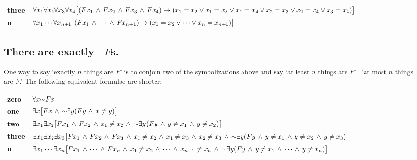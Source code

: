 {\begin{longtabu}{X[1,r]X[7,1]}
\textbf{three} & $\forall x_1\forall x_2\forall x_3\forall x_4\bigl[(Fx_1 \,\land\, Fx_2 \,\land\, Fx_3 \,\land\, Fx_4) \rightarrow (x_1=x_2 \lor x_1=x_3 \lor x_1=x_4 \lor x_2=x_3 \lor x_2=x_4 \lor x_3=x_4)\bigr]$ \\

\textbf{n} & $\forall x_1\cdots\forall x_{n+1}
\bigl[(Fx_1\,\land\, \cdots \,\land\, Fx_{n+1}) \rightarrow (x_1=x_2 \lor \cdots \lor x_n=x_{n+1})\bigr]$ 
\end{longtabu}

\subsection*{There are exactly \blank\ $F$s.}
\label{summary.exactly}

One way to say `exactly $n$ things are $F$' is to conjoin two of the symbolizations above and say `at least $n$ things are $F$' \eand\ `at most $n$ things are $F$.' The following equivalent formulae are shorter:
\begin{longtabu}{X[1,r]X[7,1]}
\textbf{zero} & $\forall x\mathord{\sim} Fx$ \\

\textbf{one} & $\exists x\bigl[Fx \,\land\, \mathord{\sim}\exists y(Fy \,\land\, x\neq y)\bigr]$ \\

\textbf{two} &  $\exists x_1\exists x_2\bigl[Fx_1 \,\land\, Fx_2 \,\land\, x_1 \neq x_2 \,\land\, \mathord{\sim}\exists y\bigl(Fy \,\land\, y\neq x_1 \,\land\, y \neq x_2\bigr) \bigr]$ \\

\textbf{three} & $\exists x_1\exists x_2\exists x_3\bigl[Fx_1 \,\land\, Fx_2 \,\land\, Fx_3 \,\land\, x_1 \neq x_2 \,\land\, x_1 \neq x_3 \,\land\, x_2 \neq x_3 \,\land\, \mathord{\sim}\exists y(Fy \,\land\, y \neq x_1 \,\land\, y \neq x_2 \,\land\, y\neq x_3) \bigr]$ \\

\textbf{n} & $\exists x_1\cdots\exists x_n\bigl[Fx_1 \,\land\,\cdots\,\land\, Fx_n  \,\land\, x_1 \neq x_2 \,\land\,\cdots\,\land\, x_{n-1}\neq x_n \,\land\,  \mathord{\sim}\exists y(Fy \,\land\, y\neq x_1 \,\land\, \cdots \,\land\, y\neq x_n)\bigr]$ \\
\end{longtabu}

}
